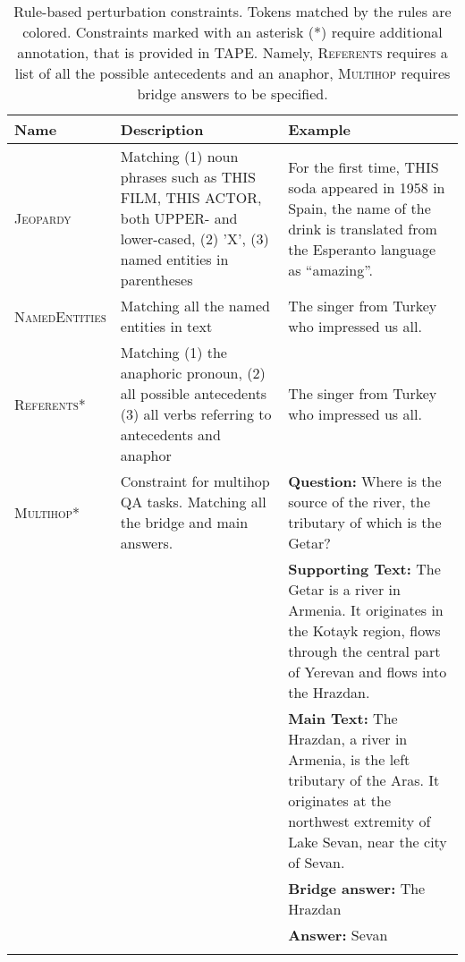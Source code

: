 \documentclass[11pt]{article}
\begin{document}
\begin{minipage}[hb!][20cm][t]{\textwidth}
\centering
\scriptsize
\begin{longtable}{lp{}p{}}
\toprule
\textbf{Name} &
  \textbf{Description} &
  \textbf{Example} \\ \midrule 
  \textsc{Jeopardy} & Matching (1) noun phrases such as THIS FILM, THIS ACTOR, both UPPER- and lower-cased, (2) 'X', (3) named entities in parentheses & For the first time, \colorbox{cb-salmon-pink}{THIS soda} appeared in 1958 in Spain, the name of the drink is translated from the Esperanto language as \colorbox{cb-salmon-pink}{“amazing”}. \\
  \midrule 
  \textsc{NamedEntities} & Matching all the named entities in text & The singer from \colorbox{cb-salmon-pink}{Turkey} who impressed us all. \\
  \midrule
  \textsc{Referents*} & Matching (1) the anaphoric pronoun, (2) all possible antecedents (3) all verbs referring to antecedents and anaphor & The \colorbox{cb-salmon-pink}{singer} from {Turkey} \colorbox{cb-salmon-pink}{who} \colorbox{cb-salmon-pink}{impressed} us all. \\
  \midrule
  \textsc{Multihop*} & Constraint for multihop QA tasks. Matching all the bridge and main answers. & \textbf{Question:} Where is the source of the river, the tributary of which is the Getar? \\
  & & \textbf{Supporting Text:} The \colorbox{cb-salmon-pink}{Getar} is a river in Armenia. It originates in the Kotayk region, flows through the central part of Yerevan and flows into \colorbox{cb-salmon-pink}{the Hrazdan}. \\
  & & \textbf{Main Text:} \colorbox{cb-salmon-pink}{The Hrazdan}, a river in Armenia, is the left tributary of the Aras. It originates at the northwest extremity of Lake \colorbox{cb-salmon-pink}{Sevan}, near the city of \colorbox{cb-salmon-pink}{Sevan}.\\
  & & \textbf{Bridge answer:} The Hrazdan \\
  & & \textbf{Answer:} Sevan \\
 \bottomrule
 \caption{Rule-based perturbation constraints. Tokens matched by the rules are colored. Constraints marked with an asterisk (*) require additional annotation, that is provided in TAPE. Namely, \textsc{Referents} requires a list of all the possible antecedents and an anaphor, \textsc{Multihop} requires bridge answers to be specified.}
\label{tab:constraints}
\end{longtable}\end{minipage}
\end{document}
